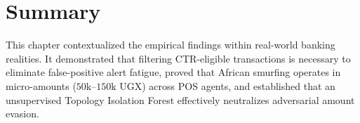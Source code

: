 \section{Summary}
This chapter contextualized the empirical findings within real-world banking realities. It demonstrated that filtering CTR-eligible transactions is necessary to eliminate false-positive alert fatigue, proved that African smurfing operates in micro-amounts ($50\text{k}\text{--}150\text{k UGX}$) across POS agents, and established that an unsupervised Topology Isolation Forest effectively neutralizes adversarial amount evasion.
